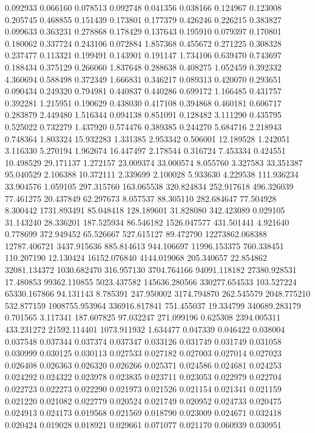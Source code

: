 0.092933
0.066160
0.078513
0.092748
0.041356
0.038166
0.124967
0.123008
0.205745
0.468855
0.151439
0.173801
0.177379
0.426246
0.226215
0.383827
0.099633
0.363231
0.278868
0.178429
0.137643
0.195910
0.079397
0.170801
0.180062
0.337724
0.243106
0.072884
1.857368
0.455672
0.271225
0.308328
0.237477
0.113321
0.199491
0.143901
0.191147
1.734106
0.639470
0.743697
0.188434
0.375129
0.266060
1.837648
0.288638
0.408275
1.052459
0.392332
4.360694
0.588498
0.372349
1.666831
0.346217
0.089313
0.420070
0.293651
0.090434
0.249320
0.794981
0.440837
0.440286
0.699172
1.166485
0.431757
0.392281
1.215951
0.190629
0.438030
0.417108
0.394868
0.460181
0.606717
0.283879
2.449480
1.516344
0.094138
0.851091
0.128482
3.111290
0.435795
0.525022
0.732279
1.437920
0.574476
0.389385
0.244270
5.684716
2.218943
0.748364
1.803324
15.932283
1.331385
2.953342
0.506001
12.189528
1.242051
3.116330
5.270194
1.962674
16.447497
2.178544
0.316724
7.453334
0.424551
10.498529
29.171137
1.272157
23.009374
33.000574
8.055760
3.327583
33.351387
95.040529
2.106388
10.372111
2.339699
2.100028
5.933630
4.229538
111.936234
33.904576
1.059105
297.315760
163.065538
320.824834
252.917618
496.326039
77.461275
20.437849
62.297673
8.057537
88.305110
282.684647
77.504928
8.300442
1731.893491
85.048418
128.189601
31.828080
342.423089
0.029105
31.143240
28.336201
187.525934
86.546182
1526.047577
431.501441
4.921640
0.778699
372.949452
65.526667
527.615127
89.472790
12273862.068388
12787.406721
3437.915636
885.814613
944.106697
11996.153375
760.338451
110.207190
12.130424
16152.076840
4144.019068
205.340657
22.854862
32081.134372
1030.682470
316.957130
3704.764166
94091.118182
27380.928531
17.480853
99362.110855
5023.437582
145636.280566
330277.654533
103.527224
65330.167866
94.131143
8.785391
247.950002
3174.794870
262.545579
2048.775210
532.877159
1008755.953964
336916.817841
751.455037
19.334799
340689.283179
0.701565
3.117341
187.607825
97.032247
271.099196
0.625308
2394.005311
433.231272
21592.114401
1073.911932
1.634477
0.047339
0.046422
0.038004
0.037548
0.037344
0.037374
0.037347
0.033126
0.031749
0.031749
0.031058
0.030999
0.030125
0.030113
0.027533
0.027182
0.027003
0.027014
0.027023
0.026408
0.026363
0.026320
0.026266
0.025371
0.024586
0.024681
0.024253
0.024292
0.024322
0.023978
0.023835
0.023711
0.023053
0.022979
0.022704
0.022723
0.022273
0.022290
0.021973
0.021526
0.021154
0.021341
0.021159
0.021220
0.021082
0.022779
0.020524
0.021749
0.020952
0.024733
0.020475
0.024913
0.024173
0.019568
0.021569
0.018790
0.023009
0.024671
0.032418
0.020424
0.019028
0.018921
0.029661
0.071077
0.021170
0.060939
0.030951
